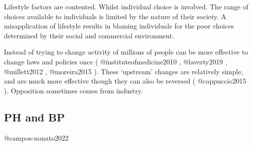 \documentclass[
]{article}
\begin{document}
Lifestyle factors are contented. Whilst individual choice is involved.
The range of choices available to individuals is limited by the nature
of their society. A misapplication of lifestyle results in blaming
individuals for the poor choices determined by their social and
commercial environment.

Instead of trying to change activity of millions of people can be more
effective to change laws and policies once ( @instituteofmedicine2010 ,
@laverty2019 , @millett2012 , @moreira2015 ). These `upstream' changes
are relatively simple, and are much more effective though they can also
be reversed ( @cappuccio2015 ). Opposition sometimes comes from
industry.

\hypertarget{ph-and-bp}{%
\subsection{PH and BP}\label{ph-and-bp}}

@campos-nonato2022
\end{document}
